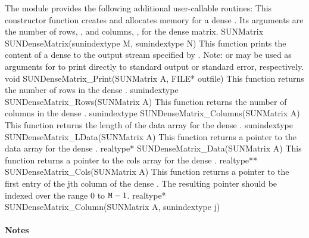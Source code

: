 The module {\sunmatdense} provides the following additional
user-callable routines:
{
  This constructor function creates and allocates memory for a dense .
  Its arguments are the number of rows, , and columns, , for
  the dense matrix.
}
{
  SUNMatrix SUNDenseMatrix(sunindextype M, sunindextype N)
}
{
  This function prints the content of a dense  to the
  output stream specified by .  Note: 
  or  may be used as arguments for  to print
  directly to standard output or standard error, respectively.
}
{
  void SUNDenseMatrix\_Print(SUNMatrix A, FILE* outfile)
}
{
  This function returns the number of rows in the dense .
}
{
  sunindextype SUNDenseMatrix\_Rows(SUNMatrix A)
}
{
  This function returns the number of columns in the dense .
}
{
  sunindextype SUNDenseMatrix\_Columns(SUNMatrix A)
}
{
  This function returns the length of the data array for the dense .
}
{
  sunindextype SUNDenseMatrix\_LData(SUNMatrix A)
}
{
  This function returns a pointer to the data array for the dense .
}
{
  realtype* SUNDenseMatrix\_Data(SUNMatrix A)
}
{
  This function returns a pointer to the cols array for the dense .
}
{
  realtype** SUNDenseMatrix\_Cols(SUNMatrix A)
}
{
  This function returns a pointer to the first entry of the jth
  column of the dense .  The resulting pointer should
  be indexed over the range $0$ to ${\tt M}-1$.
}
{
  realtype* SUNDenseMatrix\_Column(SUNMatrix A, sunindextype j)
}
\paragraph{\bf Notes}

